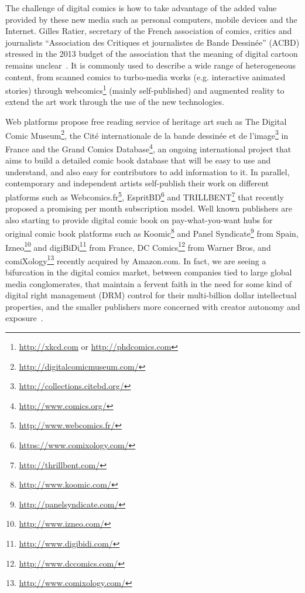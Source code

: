 The challenge of digital comics is how to take advantage of the added value provided by these new media such as personal computers, mobile devices and the Internet.
Gilles Ratier, secretary of the French association of comics, critics and journalists ``Association des Critiques et journalistes de Bande Dessin\'{e}e'' (ACBD) stressed in the 2013 budget of the association that the meaning of digital cartoon remains unclear~\cite{Ratier2013}.
It is commonly used to describe a wide range of heterogeneous content, from scanned comics to turbo-media works (e.g. interactive animated stories) through webcomics\footnote{\url{http://xkcd.com} or \url{http://phdcomics.com}} (mainly self-published) and augmented reality to extend the art work through the use of the new technologies.

Web platforms propose free reading service of heritage art such as The Digital Comic Museum\footnote{\url{http://digitalcomicmuseum.com/}}, the Cit\'{e} internationale de la bande dessin\'{e}e et de l'image\footnote{\url{http://collections.citebd.org/}} in France and the Grand Comics Database\footnote{\url{http://www.comics.org/}}, an ongoing international project that aims to build a detailed comic book database that will be easy to use and understand, and also easy for contributors to add information to it.
In parallel, contemporary and independent artists self-publish their work on different platforms such as Webcomics.fr\footnote{\url{http://www.webcomics.fr/}}, EspritBD\footnote{\url{https://www.comixology.com/}} and TRILLBENT\footnote{\url{http://thrillbent.com/}} that recently proposed a promising per month subscription model.
Well known publishers are also starting to provide digital comic book on pay-what-you-want hubs for original comic book platforms such as Koomic\footnote{\url{http://www.koomic.com/}} and Panel Syndicate\footnote{\url{http://panelsyndicate.com/}} from Spain, Izneo\footnote{\url{http://www.izneo.com/}} and digiBiDi\footnote{\url{http://www.digibidi.com/}} from France, DC Comics\footnote{\url{http://www.dccomics.com/}} from Warner Bros, and comiXology\footnote{\url{http://www.comixology.com/}} recently acquired by Amazon.com.
In fact, we are seeing a bifurcation in the digital comics market, between companies tied to large global media conglomerates, that maintain a fervent faith in the need for some kind of digital right management (DRM) control for their multi-billion dollar intellectual properties, and the smaller publishers more concerned with creator autonomy and exposure~\cite{publishersweekly2014Surveying}.

